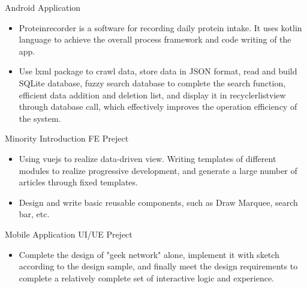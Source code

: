 \documentclass{resume}
\newcommand{\en}[1]{#1}
\newcommand{\zh}[1]{}
\begin{document}
\en{Android Application}
\zh{安卓应用}
\begin{itemize}
      \item \en{Proteinrecorder is a software for recording daily protein intake. It uses kotlin language to achieve the overall process framework and code writing of the app.}
            \zh{ProteinRecorder 是记录日常蛋白质摄入量的软件，用Kotlin语言实现app的整体流程框架和代码编写。}
      \item \en{Use lxml package to crawl data, store data in JSON format, read and build SQLite database, fuzzy search database to complete the search function, efficient data addition and deletion list, and display it in recyclerlistview through database call, which effectively improves the operation efficiency of the system.}
            \zh{使用 lxml 包爬取数据，json格式存储数据，读取并构建SQLite数据库，模糊搜索数据库以完成搜索功能， 高效的数据添加和删除列表，通过数据库的调用显示到RecyclerListView中，有效的提升了系统的运行效率。}
\end{itemize}

\en{Minority Introduction FE Preject}
\zh{少数民族 Web 前端项目}
\begin{itemize}
      \item \en{Using vuejs to realize data-driven view. Writing templates of different modules to realize progressive development, and generate a large number of articles through fixed templates.}
            \zh{Vuejs实现数据驱动视图,编写不同模块的template来实现渐进式开发，通过固定模板实现大量文章的生成。}
      \item \en{Design and write basic reusable components, such as Draw Marquee, search bar, etc.}
            \zh{设计并编写基础可复用的组件，如轮播图，搜索栏等。}
\end{itemize}

\en{Mobile Application UI/UE Preject}
\zh{极客网”交互设计方案}
\begin{itemize}
      \item \en{Complete the design of "geek network" alone, implement it with sketch according to the design sample, and finally meet the design requirements to complete a relatively complete set of interactive logic and experience.}
            \zh{独自完成”极客网”的设计，并按照设计样稿，采用Sketch进行实现，最终符合设计要求完成一套比较 完整的交互逻辑和体验。}
\end{itemize}
\end{document}
